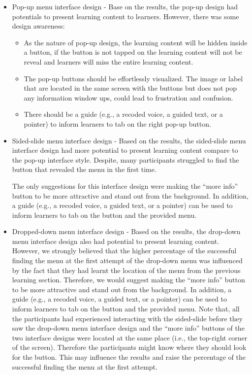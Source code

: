 \begin{itemize} 
\item Pop-up menu interface design - Base on the results, the pop-up design had potentials to present learning content to learners. However, there was some design awareness: 
\begin{itemize}
\item As the nature of pop-up design, the learning content will be hidden inside a button, if the button is not tapped on the learning content will not be reveal and learners will miss the entire learning content.
\item The pop-up buttons should be effortlessly visualized. The image or label that are located in the same screen with the buttons but does not pop any information window ups, could lead to frustration and confusion. 
\item There should be a guide (e.g., a recoded voice, a guided text, or a pointer) to inform learners to tab on the right pop-up button. 
\end{itemize}

\item Sided-slide menu interface design - Based on the results, the sided-slide menu interface design had more potential to present learning content compare to the pop-up interface style. Despite, many participants struggled to find the button that revealed the menu in the first time. 

The only suggestions for this interface design were making the ``more info'' button to be more attractive and stand out from the background. In addition, a guide (e.g., a recoded voice, a guided text, or a pointer) can be used to inform learners to tab on the button and the provided menu.

\item Dropped-down menu interface design - Based on the results, the drop-down menu interface design also had potential to present learning content. However, we strongly believed that the higher percentage of the successful finding the menu at the first attempt of the drop-down menu was influenced by the fact that they had learnt the location of the menu from the previous learning section. Therefore, we would suggest making the ``more info'' button to be more attractive and stand out from the background. In addition, a guide (e.g., a recoded voice, a guided text, or a pointer) can be used to inform learners to tab on the button and the provided menu. Note that, all the participants had experienced interacting with the sided-slide before they saw the drop-down menu interface design and the ``more info'' buttons of the two interface designs were located at the same place (i.e., the top-right corner of the screen). Therefore the participants might know where they should look for the button. This may influence the results and raise the percentage of the successful finding the menu at the first attempt. 


\end{itemize}
